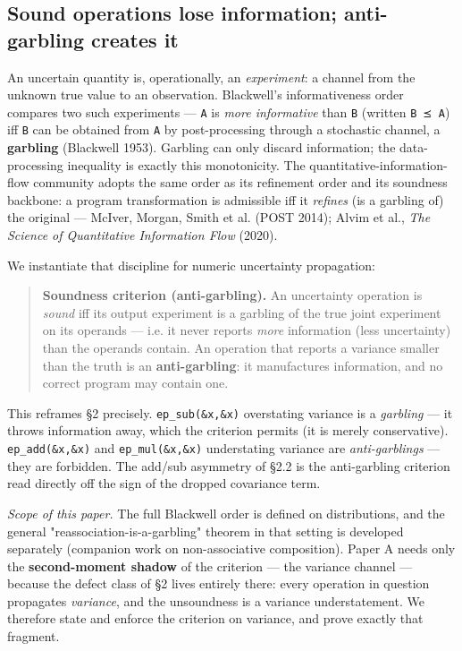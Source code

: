 \documentclass[sigplan,review,anonymous,10pt]{acmart}
\begin{document}
\subsection{Sound operations lose information; anti-garbling creates it}

An uncertain quantity is, operationally, an \emph{experiment}: a channel from the unknown true value to an observation. Blackwell's informativeness order compares two such experiments --- \texttt{A} is \emph{more informative} than \texttt{B} (written \texttt{B ⪯ A}) iff \texttt{B} can be obtained from \texttt{A} by post-processing through a stochastic channel, a \textbf{garbling} (Blackwell 1953). Garbling can only discard information; the data-processing inequality is exactly this monotonicity. The quantitative-information-flow community adopts the same order as its refinement order and its soundness backbone: a program transformation is admissible iff it \emph{refines} (is a garbling of) the original --- McIver, Morgan, Smith et al. (POST 2014); Alvim et al., \emph{The Science of Quantitative Information Flow} (2020).

We instantiate that discipline for numeric uncertainty propagation:

\begin{quote}
\textbf{Soundness criterion (anti-garbling).} An uncertainty operation is \emph{sound} iff its output experiment is a garbling of the true joint experiment on its operands --- i.e. it never reports \emph{more} information (less uncertainty) than the operands contain. An operation that reports a variance smaller than the truth is an \textbf{anti-garbling}: it manufactures information, and no correct program may contain one.
\end{quote}

This reframes §2 precisely. \texttt{ep\_sub(\&x,\&x)} overstating variance is a \emph{garbling} --- it throws information away, which the criterion permits (it is merely conservative). \texttt{ep\_add(\&x,\&x)} and \texttt{ep\_mul(\&x,\&x)} understating variance are \emph{anti-garblings} --- they are forbidden. The add/sub asymmetry of §2.2 is the anti-garbling criterion read directly off the sign of the dropped covariance term.

\emph{Scope of this paper.} The full Blackwell order is defined on distributions, and the general "reassociation-is-a-garbling" theorem in that setting is developed separately (companion work on non-associative composition). Paper A needs only the \textbf{second-moment shadow} of the criterion --- the variance channel --- because the defect class of §2 lives entirely there: every operation in question propagates \emph{variance}, and the unsoundness is a variance understatement. We therefore state and enforce the criterion on variance, and prove exactly that fragment.
\end{document}

